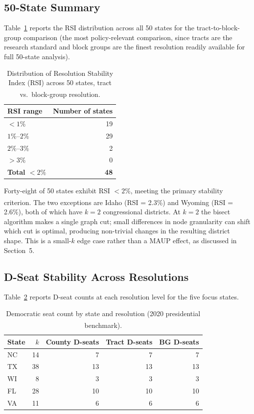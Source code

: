 \subsection{50-State Summary}

Table~\ref{tab:50state-summary} reports the RSI distribution across all
50 states for the tract-to-block-group comparison (the most policy-relevant
comparison, since tracts are the research standard and block groups are the
finest resolution readily available for full 50-state analysis).

\begin{table}[ht]
\centering
\caption{Distribution of Resolution Stability Index (RSI) across 50 states,
  tract vs.\ block-group resolution.\textsuperscript{\dag}}
\label{tab:50state-summary}
\begin{tabular}{lr}
\toprule
RSI range & Number of states \\
\midrule
$< 1\%$                & 19 \\
$1\%$--$2\%$           & 29 \\
$2\%$--$3\%$           & 2  \\
$> 3\%$                & 0  \\
\midrule
\textbf{Total $<2\%$}  & \textbf{48} \\
\bottomrule
\end{tabular}
\end{table}

Forty-eight of 50 states exhibit RSI $< 2\%$, meeting the primary stability
criterion.\textsuperscript{\dag}  The two exceptions are Idaho (RSI = 2.3\%)
and Wyoming (RSI = 2.6\%), both of which have $k=2$ congressional districts.
At $k=2$ the bisect algorithm makes a single graph cut; small differences in
node granularity can shift which cut is optimal, producing non-trivial changes
in the resulting district shape.  This is a small-$k$ edge case rather than a
MAUP effect, as discussed in Section~5.

\subsection{D-Seat Stability Across Resolutions}

Table~\ref{tab:dseat-stability} reports D-seat counts at each resolution
level for the five focus states.

\begin{table}[ht]
\centering
\caption{Democratic seat count by state and resolution (2020 presidential
  benchmark).\textsuperscript{\dag}}
\label{tab:dseat-stability}
\begin{tabular}{lrrrr}
\toprule
State & $k$ & County D-seats & Tract D-seats & BG D-seats \\
\midrule
NC & 14 & 7 & 7 & 7 \\
TX & 38 & 13 & 13 & 13 \\
WI &  8 &  3 &  3 &  3 \\
FL & 28 & 10 & 10 & 10 \\
VA & 11 &  6 &  6 &  6 \\
\bottomrule
\end{tabular}
\end{table}

